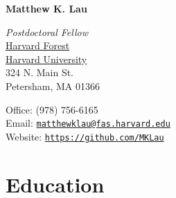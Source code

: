 \documentclass[letterpaper]{article}
\def\name{Matthew K. Lau}
\begin{document}
\centerline{\huge\bf \name}

\vspace{0.25in}
\begin{minipage}[t]{0.5\textwidth}
  \textit{Postdoctoral Fellow} \\
  \href{http://harvardforest.fas.harvard.edu}{Harvard Forest} \\
  \href{http://harvard.edu}{Harvard University} \\
  324 N. Main St. \\
  Petersham, MA 01366

\end{minipage}
\begin{minipage}[t]{0.5\textwidth}
  Office: (978) 756-6165 \\
  Email: \href{mailto:matthewklau@fas.harvard.edu}{\tt matthewklau@fas.harvard.edu} \\
  Website: \href{https://github.com/MKLau}{\tt https://github.com/MKLau} \\  
\end{minipage}

\section{Education}
\end{document}
